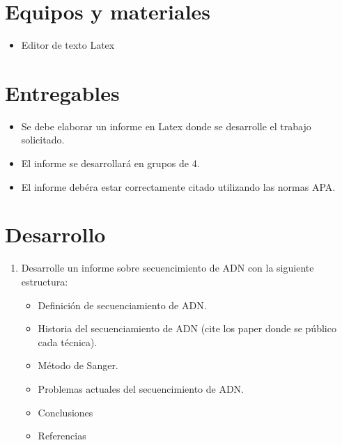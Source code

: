 \documentclass{article}
\begin{document}
	\section{Equipos y materiales}
	\begin{itemize}
		\item Editor de texto  Latex 
	\end{itemize}
	
	\section{Entregables}
	\begin{itemize}
		\item Se debe elaborar un informe en Latex donde se desarrolle el trabajo solicitado.
		\item El informe se desarrollará en grupos de 4.
		\item El informe debéra estar correctamente citado utilizando las normas APA.
	\end{itemize}
		
	
	
	\clearpage
	
	
	\section{Desarrollo}\label{sec:ejercicios}
	\begin{enumerate}
		\item Desarrolle un informe sobre secuencimiento de ADN con la siguiente estructura:
			\begin{itemize}
				\item Definición de secuenciamiento de ADN.
				\item Historia del secuenciamiento de ADN (cite los paper donde se público cada técnica).
				\item Método de Sanger.
				\item Problemas actuales del secuencimiento de ADN.
				\item Conclusiones
				\item Referencias
			\end{itemize}
	
	\end{enumerate}
	
	
	
\end{document}
